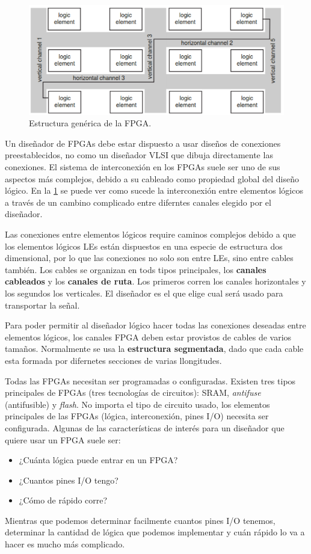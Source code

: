 \begin{figure}[H] \centering
    \includegraphics[width=0.6\linewidth]{Imagenes/03/03-FPGA_Interconexion.png} 
    \caption{Estructura genérica de la FPGA.}   
    \label{Fig:03-FPGA_Interconexion}
\end{figure}
Un diseñador de FPGAs debe estar dispuesto a usar diseños de conexiones preestablecidos, no como un diseñador VLSI que dibuja directamente las conexiones. El sistema de interconexión en los FPGAs suele ser uno de sus aspectos más complejos, debido a su cableado como propiedad global del diseño lógico. En la \cref{Fig:03-FPGA_Interconexion} se puede ver como sucede la interconexión entre elementos lógicos a través de un cambino complicado entre diferntes canales elegido por el diseñador.

Las conexiones entre elementos lógicos require caminos complejos debido a que los elementos lógicos LEs están dispuestos en una especie de estructura dos dimensional, por lo que las conexiones no solo son entre LEs, sino entre cables también. Los cables se organizan en tods tipos principales, los \textbf{canales cableados} y los \textbf{canales de ruta}. Los primeros corren los canales horizontales y los segundos los verticales. El diseñador es el que elige cual será usado para transportar la señal. 

Para poder permitir al diseñador lógico hacer todas las conexiones deseadas entre elementos lógicos, los canales FPGA deben estar provistos de cables de varios tamaños. Normalmente se usa la \textbf{estructura segmentada}, dado que cada cable esta formada por difernetes secciones de varias llongitudes. 

Todas las FPGAs necesitan ser programadas o configuradas. Existen tres tipos principales de FPGAs (tres tecnologías de circuitos): SRAM, \textit{antifuse} (antifusible) y \textit{flash}. No importa el tipo de circuito usado, los elementos principales de las FPGAs (lógica, interconexión, pines I/O) necesita ser configurada. Algunas de las características de interés para un diseñador que quiere usar un FPGA suele ser: 

\begin{itemize}
    \item ¿Cuánta lógica puede entrar en un FPGA? 
    \item ¿Cuantos pines I/O tengo? 
    \item ¿Cómo de rápido corre? 
\end{itemize}
Mientras que podemos determinar facilmente cuantos pines I/O tenemos, determinar la cantidad de lógica que podemos implementar y cuán rápido lo va a hacer es mucho más complicado. 




